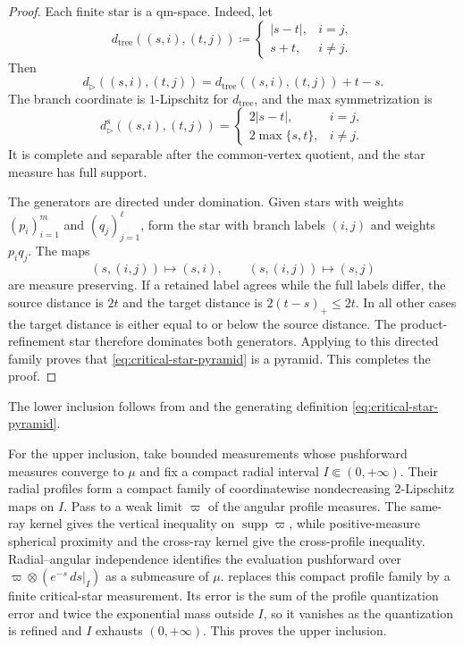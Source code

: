 \documentclass{amsart}
\numberwithin{equation}{section}
\theoremstyle{plain}
\theoremstyle{definition}
\theoremstyle{remark}
\DeclareMathOperator{\supp}{supp}
\begin{document}
\begin{proof}
Each finite star is a qm-space.  Indeed, let
\[
 d_{\mathrm{tree}}((s,i),(t,j))
 \coloneqq\begin{cases}|s-t|,&i=j,\\s+t,&i\ne j.
 \end{cases}
\]
Then
\begin{equation}\label{eq:star-tree-potential} d_{\rhd}((s,i),(t,j)) =d_{\mathrm{tree}}((s,i),(t,j))+t-s. \end{equation}
The branch coordinate is $1$-Lipschitz for $d_{\mathrm{tree}}$, and the max symmetrization is
\begin{equation}\label{eq:star-symmetrization}
 d_{\rhd}^{\mathrm s}((s,i),(t,j))
 =\begin{cases}
 2|s-t|,&i=j,\\
 2\max\{s,t\},&i\ne j.
 \end{cases}
\end{equation}
It is complete and separable after the common-vertex quotient, and the star measure has full support.

The generators are directed under domination.  Given stars with weights $(p_i)_{i=1}^m$ and $(q_j)_{j=1}^\ell$, form the star with branch labels $(i,j)$ and weights $p_iq_j$.  The maps
\[ (s,(i,j))\longmapsto(s,i), \qquad (s,(i,j))\longmapsto(s,j) \]
are measure preserving.  If a retained label agrees while the full labels differ, the source distance is $2t$ and the target distance is $2(t-s)_+\le2t$.  In all other cases the target distance is either equal to or below the source distance.  The product-refinement star therefore dominates both generators.  Applying  to this directed family proves that \eqref{eq:critical-star-pyramid} is a pyramid.  This completes the proof.
\end{proof}

The lower inclusion follows from  and the generating definition \eqref{eq:critical-star-pyramid}.

For the upper inclusion, take bounded measurements whose pushforward measures converge to $\mu$ and fix a compact radial interval $I\Subset(0,+\infty)$.  Their radial profiles form a compact family of coordinatewise nondecreasing $2$-Lipschitz maps on $I$.  Pass to a weak limit $\varpi$ of the angular profile measures.  The same-ray kernel gives the vertical inequality on $\supp\varpi$, while positive-measure spherical proximity and the cross-ray kernel give the cross-profile inequality.  Radial--angular independence identifies the evaluation pushforward over $\varpi\otimes(e^{-s}\,ds|_I)$ as a submeasure of $\mu$.   replaces this compact profile family by a finite critical-star measurement.  Its error is the sum of the profile quantization error and twice the exponential mass outside $I$, so it vanishes as the quantization is refined and $I$ exhausts $(0,+\infty)$.  This proves the upper inclusion.
\end{document}
